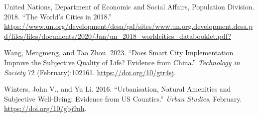 \documentclass[
  english,
  12pt,
  a4paper,
]{scrartcl}
\newlength{\cslhangindent}
\newenvironment{CSLReferences}[2] %
 {\begin{list}{}{%
  \setlength{\itemindent}{0pt}
  \setlength{\leftmargin}{0pt}
  \setlength{\parsep}{0pt}
  \ifodd #1
   \setlength{\leftmargin}{\cslhangindent}
   \setlength{\itemindent}{-1\cslhangindent}
  \fi
  \setlength{\itemsep}{#2\baselineskip}}}
 {\end{list}}
\begin{document}
\begin{CSLReferences}{1}{0}
United Nations, Department of Economic and Social Affairs, Population
Division. 2018. {``The {World}'s Cities in 2018.''}
\url{https://www.un.org/development/desa/pd/sites/www.un.org.development.desa.pd/files/files/documents/2020/Jan/un_2018_worldcities_databooklet.pdf?}

Wang, Mengmeng, and Tao Zhou. 2023. {``Does Smart City Implementation
Improve the Subjective Quality of Life? {Evidence} from {China}.''}
\emph{Technology in Society} 72 (February):102161.
\url{https://doi.org/10/gtr4sj}.

Winters, John V., and Yu Li. 2016. {``Urbanisation, Natural Amenities
and Subjective Well-Being: {Evidence} from {US} Counties.''} \emph{Urban
Studies}, February. \url{https://doi.org/10/gbj9nh}.

\end{CSLReferences}
\end{document}
